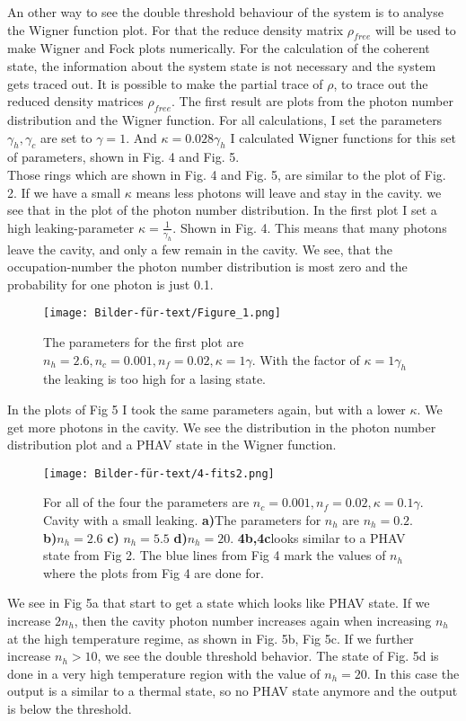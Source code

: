 \documentclass[12pt,a4paper]{article}
\begin{document}
\newpage
An other way to see the double threshold behaviour of the system is to analyse the Wigner function plot. For that the reduce density matrix $\rho_{free}$ will be used to make Wigner and Fock plots numerically. For the calculation of the coherent state, the information about the system state is not necessary and the system gets traced out. 
It is possible to make the partial trace of $\rho$, to trace out the reduced density matrices $\rho_{free}$. 
The first result are plots from the photon number distribution and the Wigner function.
 For all calculations, I set the parameters $\gamma_h, \gamma_c $ are set to $\gamma=1$. And $\kappa=0.028 \gamma_h$
I calculated Wigner functions for this set of parameters, shown in Fig. 4 and Fig. 5.\\
Those rings which are shown in Fig. 4 and Fig. 5, are similar to the plot of Fig. 2.
If we have a small $\kappa$ means less photons will leave and stay in the cavity. we see that in the plot of the photon number distribution.
In the first plot I set a high leaking-parameter $\kappa=\frac{1}{\gamma_h}$. Shown in Fig. 4.
This means that many photons leave the cavity, and only a few remain in the cavity. 
We see, that the occupation-number the photon number distribution is most zero and the probability for one photon is just 0.1.

\begin{figure}[hbtp]
\centering
\texttt{[image: Bilder-für-text/Figure\_1.png]}
\caption{The parameters for the first plot are $n_h=2.6, n_c=0.001, n_f=0.02, \kappa=1\gamma $. With  the factor of $\kappa=1\gamma_h$ the leaking is too high for a lasing state.}
\end{figure}\newpage

In the plots of Fig 5 I took the same parameters again, but with a lower $\kappa$. We get more photons in the cavity. We see the distribution in the photon number distribution plot and a PHAV state in the Wigner function. 
\begin{figure}[h!]
\centering
\texttt{[image: Bilder-für-text/4-fits2.png]}
\caption{For all of the four the parameters are $n_c=0.001, n_f=0.02, \kappa=0.1\gamma$. Cavity with a small leaking.
\textbf{a)}The parameters for $n_h$ are $n_h=0.2 $.
\textbf{b)}$ n_h=2.6$ 
\textbf{c)} $ n_h=5.5$ 
\textbf{d)}$ n_h=20$. 
\textbf{4b,4c}looks similar to a PHAV state from Fig 2. The blue lines from Fig 4 mark the values of $n_h$ where the plots from Fig 4 are done for. }
\end{figure}
\newpage
We see in Fig 5a that start to get a state which looks like PHAV state.
If we increase  $2n_h $,
then the cavity photon number increases again when increasing $n_h$ at the
high temperature regime, as shown in Fig. 5b, Fig 5c. 
If we further increase  $n_h >10$, we see the double threshold behavior. 
The state of Fig. 5d is done in a very high temperature region with the value of $n_h=20$. In this  case the output is a similar to a thermal state, so no PHAV state anymore and the output is below the threshold.
\end{document}
